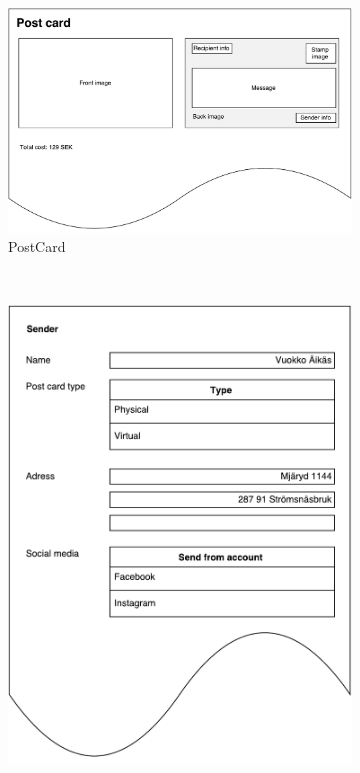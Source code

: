 \documentclass[10pt,a4paper]{article}
\begin{document}
\begin{figure}[!ht]
\centering
\begin{subfigure}{0.3\textwidth}
\includegraphics[width=\linewidth]{Data_figures/virtualwindows_postcard.pdf}
\caption{PostCard}
\label{fig:virtualwindows_postcard}
\end{subfigure}\hfill
~
\begin{subfigure}{0.3\textwidth}
\includegraphics[width=\linewidth]{Data_figures/virtualwindows_sender.pdf}

\end{subfigure}
\end{figure}
\end{document}

